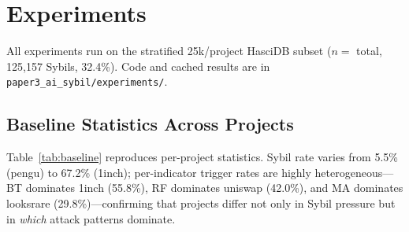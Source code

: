 \documentclass[sigconf,nonacm=false]{acmart}
\begin{document}
\section{Experiments}
\label{sec:experiments}

All experiments run on the stratified 25k/project HasciDB subset ($n{=}$\largeScaleNAddresses{} total, 125,157 Sybils, 32.4\%). Code and cached results are in \texttt{paper3\_ai\_sybil/experiments/}.

\subsection{Baseline Statistics Across \largeScaleNProjects{} Projects}
\label{sec:baseline}

Table~\ref{tab:baseline} reproduces per-project statistics. Sybil rate varies from 5.5\% (pengu) to 67.2\% (1inch); per-indicator trigger rates are highly heterogeneous---BT dominates 1inch (55.8\%), RF dominates uniswap (42.0\%), and MA dominates looksrare (29.8\%)---confirming that projects differ not only in Sybil pressure but in \textit{which} attack patterns dominate.
\end{document}
